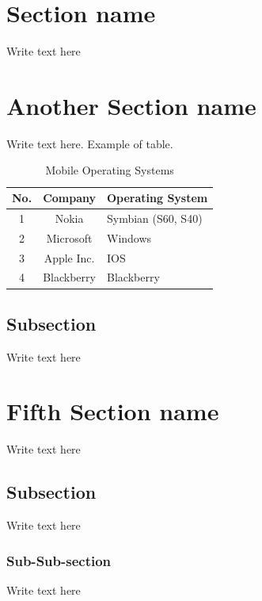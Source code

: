 \documentclass[12pt]{article}
\begin{document}
\pagebreak

\section{Section name}
Write text here

\pagebreak

\section{Another Section name}
Write text here. Example of table.
\begin{table}[H]
\begin{center}
\begin{tabular}{|c|c|p{4cm}|}
 \hline
 \textbf{No.} & \textbf{Company} & \textbf{Operating System} \\
 \hline
 1 & Nokia & Symbian (S60, S40) \\
 \hline
 2 & Microsoft & Windows \\
 \hline
 3 & Apple Inc. & IOS \\
 \hline
 4 & Blackberry & Blackberry \\
 \hline
\end{tabular}
 \caption{Mobile Operating Systems}
 \end{center}
\end{table}

\subsection{Subsection}
Write text here


\section{Fifth Section name}
Write text here

\subsection{Subsection}
Write text here

\subsubsection{Sub-Sub-section}
Write text here



\end{document}

